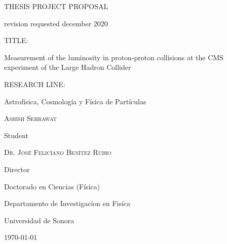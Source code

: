 \documentclass[final,3p]{CSP}
\def\Student{Ashish Sehrawat}
\def\Title{THESIS PROJECT PROPOSAL}
\def\Prog{Doctorado en Ciencias (F\'{i}sica) }
\def\Dept{Departamento de Investigac\'{i}on en Fis\'{i}ca}
\def\Institution{Universidad de Sonora}
\def\Director{Dr. Jos\'{e} Feliciano Ben\'{i}tez Rubio}
\def\ProjectTitle{Measurement of the luminosity in proton-proton collisions at the CMS experiment of the Large Hadron Collider}
\def\ResearchLine{Astrof\'{i}sica, Cosmolog\'{i}a y F\'{i}sica de Part\'{i}culas}
\begin{document}
\begin{titlepage}
  \centering
  \hspace{0pt}
  \vfill
      {\scshape\Large \Title \par}
      revision requested december 2020
      
      \vspace{2cm}
       {
         TITLE:\par
         {\large \ProjectTitle \par}
       }
       
       \vspace{0.5cm}
       {
         RESEARCH LINE: \par
         \ResearchLine \par
       }

        
       \vspace{4cm}
       {\underline{\hspace{8cm}}\par}
       {\scshape \Student \par}
       {Student\par}

       \vspace{1cm}
       {\underline{\hspace{8cm}}\par}
       {\scshape \Director \par}
       {Director\par}

       \vspace{1cm}
       {\Prog \par}
       {\Dept \par}
       {\Institution \par}

       \vspace{4cm}
       {\today}

\hspace{0pt}
\vfill

\end{titlepage}


\shipout\null


\newpage
\hspace{2pt}
\vfill
\end{document}
